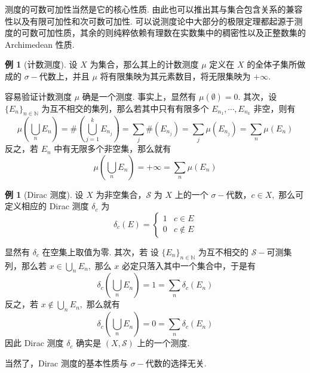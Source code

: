 \documentclass[12pt, a4paper, oneside]{book}
\numberwithin{figure}{section}
\theoremstyle{definition}
\newtheorem{example}[theorem]{例}
\begin{document}
测度的可数可加性当然是它的核心性质. 由此也可以推出其与集合包含关系的兼容性以及有限可加性和次可数可加性. 可以说测度论中大部分的极限定理都起源于测度的可数可加性质，其余的则纯粹依赖有理数在实数集中的稠密性以及正整数集的 Archimedean 性质.

\begin{example}[计数测度]
    设 $X$ 为集合，那么其上的计数测度 $\mu$ 定义在 $X$ 的全体子集所做成的 $\sigma-$代数上，并且 $\mu$ 将有限集映为其元素数目，将无限集映为 $+\infty.$
\end{example}
容易验证计数测度 $\mu$ 确是一个测度. 事实上，显然有 $\mu(\emptyset)=0.$ 其次，设 $\{E_n\}_{n\in\mathbb N}$ 为互不相交的集列，那么若其中只有有限多个 $E_{n_1},\cdots,E_{n_k}$ 非空，则有 
\begin{equation}
    \mu\left(\bigcup_n E_n\right)=\#\left(\bigcup_{j=1}^k E_{n_j}\right)=\sum_j \#(E_{n_j})=\sum_j \mu(E_{n_j})=\sum_n \mu(E_n)
\end{equation}
反之，若 $E_n$ 中有无限多个非空集，那么就有
\begin{equation}
    \mu\left(\bigcup_n E_n\right)=+\infty=\sum_n \mu(E_n)
\end{equation}

\begin{example}[Dirac 测度]
    设 $X$ 为非空集合，$\mathcal S$ 为 $X$ 上的一个 $\sigma-$代数，$c\in X,$ 那么可定义相应的 Dirac 测度 $\delta_c$ 为 
    \begin{equation}
        \delta_c(E)=\begin{cases}
            1&c\in E\\
            0&c\notin E
            \end{cases}
    \end{equation}
\end{example}

显然有 $\delta_c$ 在空集上取值为零. 其次，若 设 $\{E_n\}_{n\in\mathbb N}$ 为互不相交的 $\mathcal S-$可测集列，那么若 $x\in \bigcup_n E_n,$ 那么 $x$ 必定只落入其中一个集合中，于是有
\begin{equation}
    \delta_c\left(\bigcup_n E_n\right) = 1 = \sum_n \delta_c(E_n)
\end{equation}
反之，若 $x\notin \bigcup_n E_n,$ 那么就有
\begin{equation}
    \delta_c\left(\bigcup_n E_n\right) = 0 = \sum_n \delta_c(E_n)
\end{equation}
因此 Dirac 测度 $\delta_c$ 确实是 $(X,\mathcal S)$ 上的一个测度.

当然了，Dirac 测度的基本性质与 $\sigma-$代数的选择无关.
\end{document}
